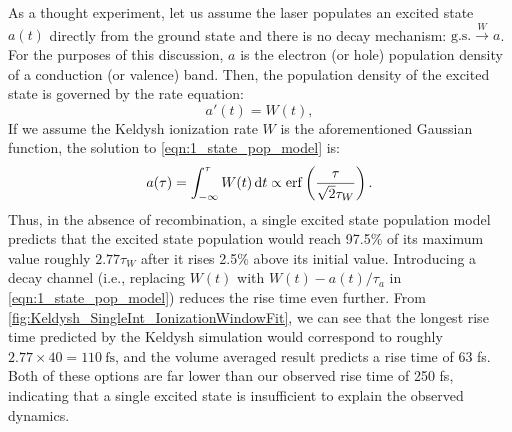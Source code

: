 As a thought experiment, let us assume the laser populates an excited state $a(t)$ directly from the ground state and there is no decay mechanism: $\textrm{g.s.} \xrightarrow{W} a$. For the purposes of this discussion, $a$ is the electron (or hole) population density of a conduction (or valence) band. Then, the population density of the excited state is governed by the rate equation:
\begin{equation}
\label{eqn:1_state_pop_model}
a'(t) = W(t),
\end{equation}
If we assume the Keldysh ionization rate $W$ is the aforementioned Gaussian function, the solution to \cref{eqn:1_state_pop_model} is:
\begin{equation}
a(\tau) = \int_{-\infty}^{\tau} W(t) \dd{t} \propto \erf\left(\frac{\tau}{\sqrt{2}\tau_W}\right).
\end{equation}
Thus, in the absence of recombination, a single excited state population model predicts that the excited state population would reach 97.5\% of its maximum value roughly $2.77\tau_W$ after it rises 2.5\% above its initial value. Introducing a decay channel (i.e., replacing $W(t)$ with ${W(t)-a(t)/\tau_a}$ in \cref{eqn:1_state_pop_model}) reduces the rise time even further. From \cref{fig:Keldysh_SingleInt_IonizationWindowFit}, we can see that the longest rise time predicted by the Keldysh simulation would correspond to roughly $2.77 \times 40 = 110 \ \textrm{fs}$, and the volume averaged result predicts a rise time of 63 fs. Both of these options are far lower than our observed rise time of 250 fs, indicating that a single excited state is insufficient to explain the observed dynamics.

